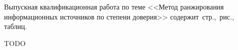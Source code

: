 \Referat

Выпускная квалификационная работа по теме <<Метод ранжирования информационных источников по степени доверия>> содержит \pageref{LastPage}\,стр., \totfig{}\,рис., \tottab{}\,таблиц.

TODO
